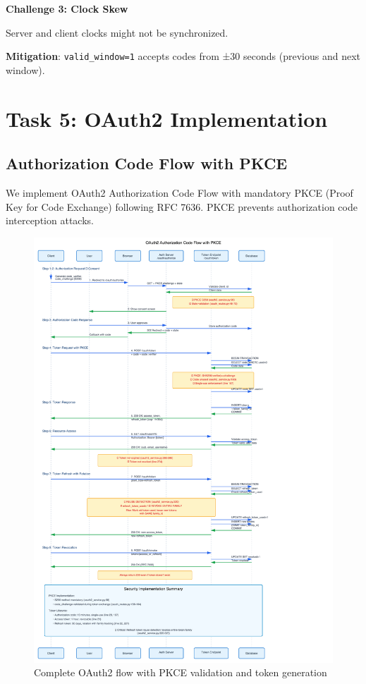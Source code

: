 \documentclass[12pt,a4paper]{article}
\begin{document}
\textbf{Challenge 3: Clock Skew}

Server and client clocks might not be synchronized.

\textbf{Mitigation}: \texttt{valid\_window=1} accepts codes from ±30 seconds (previous and next window).

\section{Task 5: OAuth2 Implementation}

\subsection{Authorization Code Flow with PKCE}

We implement OAuth2 Authorization Code Flow with mandatory PKCE (Proof Key for Code Exchange) following RFC 7636. PKCE prevents authorization code interception attacks.

\begin{figure}[H]
    \centering
    \includegraphics[width=\textwidth]{diagrams/3_oauth2_sequence.png}
    \caption{Complete OAuth2 flow with PKCE validation and token generation}
    \label{fig:oauth2}
\end{figure}
\end{document}
